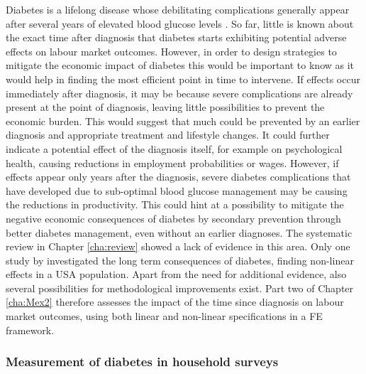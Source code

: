 Diabetes is a lifelong disease whose debilitating complications generally appear after several years of elevated blood glucose levels \parencite{WorldHealthOrganization2016}. So far, little is known about the exact time after diagnosis that diabetes starts exhibiting potential adverse effects on labour market outcomes. However, in order to design strategies to mitigate the economic impact of diabetes this would be important to know as it would help in finding the most efficient point in time to intervene. If effects occur immediately after diagnosis, it may be because severe complications are already present at the point of diagnosis, leaving little possibilities to prevent the economic burden. This would suggest that much could be prevented by an earlier diagnosis and appropriate treatment and lifestyle changes. It could further indicate a potential effect of the diagnosis itself, for example on psychological health, causing reductions in employment probabilities or wages. However, if effects appear only years after the diagnosis, severe diabetes complications that have developed due to sub-optimal blood glucose management may be causing the reductions in productivity. This could hint at a possibility to mitigate the negative economic consequences of diabetes by secondary prevention through better diabetes management, even without an earlier diagnoses. The systematic review in Chapter \ref{cha:review} showed a lack of evidence in this area. Only one study by \textcite{Minor2013} investigated the long term consequences of diabetes, finding non-linear effects in a USA population. Apart from the need for additional evidence, also several possibilities for methodological improvements exist. Part two of Chapter \ref{cha:Mex2} therefore assesses the impact of the time since diagnosis on labour market outcomes, using both linear and non-linear specifications in a \ac{FE} framework. 

\subsubsection{Measurement of diabetes in household surveys}

